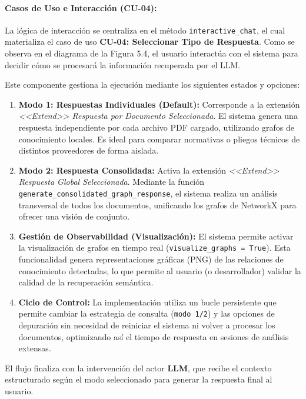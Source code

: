 \paragraph{Casos de Uso e Interacción (CU-04):}
La lógica de interacción se centraliza en el método \texttt{inter\-active\_chat}, el cual materializa el caso de uso \textbf{CU-04: Seleccionar Tipo de Respuesta}. Como se observa en el diagrama de la Figura 5.4, el usuario interactúa con el sistema para decidir cómo se procesará la información recuperada por el LLM.

Este componente gestiona la ejecución mediante los siguientes estados y opciones:

\begin{enumerate}
    \item \textbf{Modo 1: Respuestas Individuales (Default):}
    Corresponde a la extensión \textit{<<Extend>> Respuesta por Documento Seleccionada}. El sistema genera una respuesta independiente por cada archivo PDF cargado, utilizando grafos de conocimiento locales. Es ideal para comparar normativas o pliegos técnicos de distintos proveedores de forma aislada.

    \item \textbf{Modo 2: Respuesta Consolidada:}
    Activa la extensión \textit{<<Extend>> Respuesta Global Seleccionada}. Mediante la función \texttt{generate\_consolidated\_graph\_response}, el sistema realiza un análisis transversal de todos los documentos, unificando los grafos de NetworkX para ofrecer una visión de conjunto.

    \item \textbf{Gestión de Observabilidad (Visualización):}
    El sistema permite activar la visualización de grafos en tiempo real (\texttt{visualize\_graphs = True}). Esta funcionalidad genera representaciones gráficas (PNG) de las relaciones de conocimiento detectadas, lo que permite al usuario (o desarrollador) validar la calidad de la recuperación semántica.

    \item \textbf{Ciclo de Control:}
    La implementación utiliza un bucle persistente que permite cambiar la estrategia de consulta (\texttt{modo 1/2}) y las opciones de depuración sin necesidad de reiniciar el sistema ni volver a procesar los documentos, optimizando así el tiempo de respuesta en sesiones de análisis extensas.
\end{enumerate}

El flujo finaliza con la intervención del actor \textbf{LLM}, que recibe el contexto estructurado según el modo seleccionado para generar la respuesta final al usuario.

